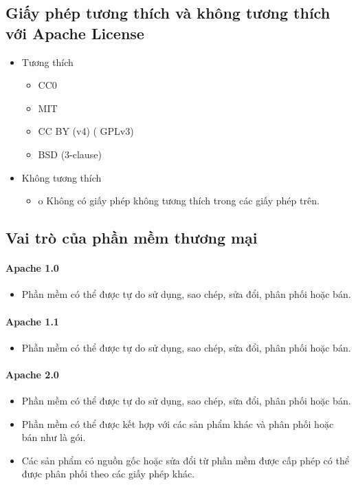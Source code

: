 \documentclass[12pt]{article}
\begin{document}
\subsection{Giấy phép tương thích và không tương thích với Apache License}
\begin{itemize}
\item Tương thích
\begin{itemize}
\item CC0 
\item MIT 
\item CC BY (v4) ( GPLv3)
\item BSD (3-clause) 
\end{itemize}
\item Không tương thích
\begin{itemize}
\item o	Không có giấy phép không tương thích trong các giấy phép trên.
\end{itemize}
\end{itemize}

\subsection{Vai trò của phần mềm thương mại}
\paragraph{Apache 1.0}
\begin{itemize}
\item Phần mềm có thể được tự do sử dụng, sao chép, sửa đổi, phân phối hoặc bán.
\end{itemize}
\paragraph{Apache 1.1}
\begin{itemize}
\item Phần mềm có thể được tự do sử dụng, sao chép, sửa đổi, phân phối hoặc bán.
\end{itemize}
\paragraph{Apache 2.0}
\begin{itemize}
\item Phần mềm có thể được tự do sử dụng, sao chép, sửa đổi, phân phối hoặc bán.
\item Phần mềm có thể được kết hợp với các sản phẩm khác và phân phối hoặc bán như là gói.
\item Các sản phẩm có nguồn gốc hoặc sửa đổi từ phần mềm được cấp phép có thể được phân phối theo các giấy phép khác.
\end{itemize}
\end{document}
